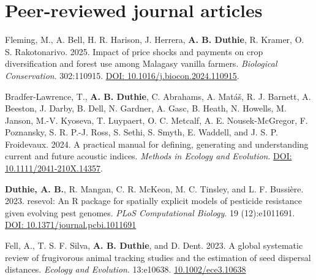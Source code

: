 \documentclass[letterpaper]{article}
\begin{document}
\section*{Peer-reviewed journal articles}
\begin{etaremune}
\item Fleming, M., A. Bell, H. R. Harison, J. Herrera, {\bf A. B. Duthie}, R. Kramer, O. S. Rakotonarivo. 2025. Impact of price shocks and payments on crop diversification and forest use among Malagasy vanilla farmers. {\it Biological Conservation}. 302:110915. \href{https://www.sciencedirect.com/science/article/pii/S0006320724004774?dgcid=coauthor}{DOI: 10.1016/j.biocon.2024.110915}.
\item Bradfer-Lawrence, T., {\bf A. B. Duthie}, C. Abrahams, A. Mat\'{a}\v{s}, R. J. Barnett, A. Beeston, J. Darby, B. Dell, N. Gardner, A. Gasc, B. Heath, N. Howells, M. Janson, M.-V. Kyoseva, T. Luypaert, O. C. Metcalf, A. E. Nousek-McGregor, F. Poznansky, S. R. P.-J. Ross, S. Sethi, S. Smyth, E. Waddell, and J. S. P. Froidevaux. 2024. A practical manual for defining, generating and understanding current and future acoustic indices. {\it Methods in Ecology and Evolution}. \href{https://besjournals.onlinelibrary.wiley.com/doi/10.1111/2041-210X.14357}{DOI: 10.1111/2041-210X.14357}.
\item {\bf Duthie, A. B.}, R. Mangan, C. R. McKeon, M. C. Tinsley, and L. F. Bussi\`{e}re. 2023. resevol: An R package for spatially explicit models of pesticide resistance given evolving pest genomes. {\it PLoS Computational Biology}. 19 (12):e1011691. \href{https://journals.plos.org/ploscompbiol/article?id=10.1371/journal.pcbi.1011691}{DOI: 10.1371/journal.pcbi.1011691}
\item Fell, A., T. S. F. Silva, {\bf A. B. Duthie}, and D. Dent. 2023. A global systematic review of frugivorous animal tracking studies and the estimation of seed dispersal distances. {\it Ecology and Evolution}. 13:e10638. \href{https://onlinelibrary.wiley.com/doi/10.1002/ece3.10638}{10.1002/ece3.10638}

\end{etaremune}
\end{document}
